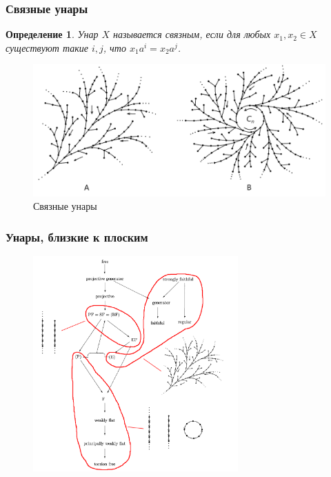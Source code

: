 \documentclass[11pt, notheorems]{beamer}
\newtheorem{definition}{Определение}
\begin{document}
\begin{frame}
	\frametitle{Связные унары}

	\begin{definition}
		Унар $X$ называется \textit{связным}, если для любых $x_1, x_2 \in X$ существуют такие $i, j$, что $x_1 a^i = x_2 a^j$.
	\end{definition}

	\begin{figure}
		\center
		\includegraphics[width=1.0\textwidth]{connected_unars}
		\caption{Связные унары}
	\end{figure}
\end{frame}

\begin{frame}
	\frametitle{Унары, близкие к плоским}

	\begin{figure}
		\center
		\includegraphics[width=0.7\textwidth]{overview_5.png}
	\end{figure}
\end{frame}
\end{document}
